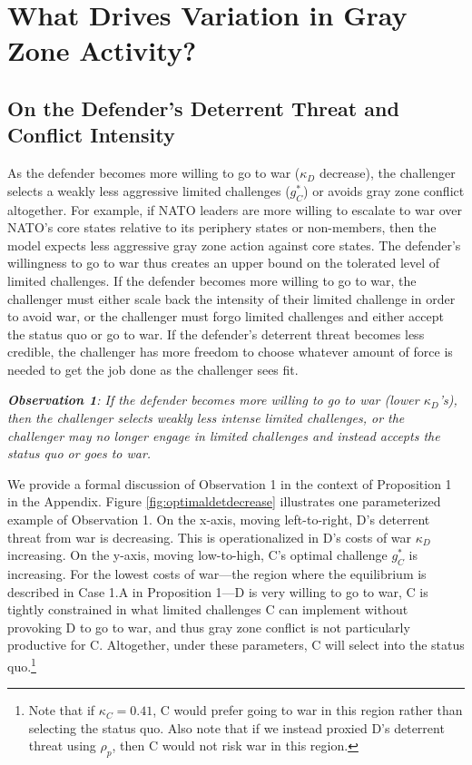 \documentclass[bibtex, autowc]{apsr_submission}
\begin{document}
\section{What Drives Variation in Gray Zone Activity?}\label{grayzonevar}
\subsection{On the Defender's Deterrent Threat and Conflict Intensity}
As the defender becomes more willing to go to war ($\kappa_{D}$ decrease), the challenger selects a weakly less aggressive limited challenges ($g_{C}^{*}$) or avoids gray zone conflict altogether. For example, if NATO leaders are more willing to escalate to war over NATO's core states relative to its periphery states or non-members, then the model expects less aggressive gray zone action  
against core states. The defender's willingness to go to war thus creates an upper bound on the tolerated level of limited challenges. If the defender becomes more willing to go to war, the challenger must either scale back the intensity of their limited challenge in order to avoid war, or the challenger must forgo limited challenges and %
either accept the status quo or go to war. If the defender's deterrent threat becomes less credible, the challenger has more freedom %
to choose whatever amount of force is needed to get the job done as the challenger sees fit.

\textbf{\textit{Observation 1}}\textit{: If the defender becomes more willing to go to war (lower $\kappa_{D}$'s), then the challenger selects weakly less intense limited challenges, or the challenger may no longer engage in limited challenges and instead accepts the status quo or goes to war.}

We provide a formal discussion of Observation 1 in the context of Proposition 1 in the Appendix. Figure \ref{fig:optimaldetdecrease} illustrates one parameterized example of Observation 1. On the x-axis, moving left-to-right, D's deterrent threat from war is decreasing. This is operationalized in D's costs of war $\kappa_{D}$ increasing. On the y-axis, moving low-to-high, C's optimal challenge $g_{C}^{*}$ is increasing. For the lowest costs of war---the region where the equilibrium is described in Case 1.A in Proposition 1---D is very willing to go to war, C is tightly constrained in what limited challenges C can implement without provoking D to go to war, and thus gray zone conflict is not particularly productive for C. Altogether, under these parameters, C will select into the status quo.\footnote{Note that if $\kappa_{C}=0.41$, C would prefer going to war in this region rather than selecting the status quo. Also note that if we instead proxied D's deterrent threat using $\rho_p$, then C would not risk war in this region.}
\end{document}
